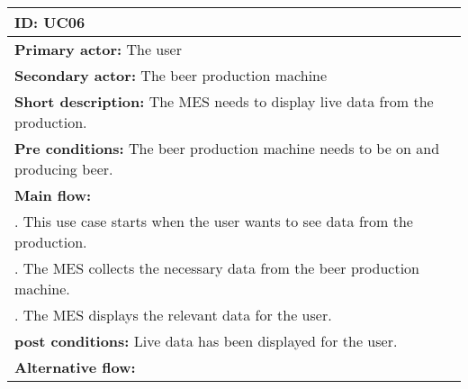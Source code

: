 \begin{table}[ht]
    \begin{tabularx}{\textwidth}{|>{\RaggedRight}X|}
        \hline
        \textbf{ID:} UC06  \\
        \hline
        \textbf{Primary actor:} The user \\
        \hline
        \textbf{Secondary actor:} The beer production machine \\
        \hline
        \textbf{Short description:} The MES needs to display live data from the
        production. \\
        \hline
        \textbf{Pre conditions:} The beer production machine needs to be on and
        producing beer. \\
        \hline
        \textbf{Main flow:} \\
        	1. This use case starts when the user wants to see data from the
        	production. \\
			2. The MES collects the necessary data from the beer production
			machine. \\
			3. The MES displays the relevant data for the user. \\
		\hline
        \textbf{post conditions:} Live data has been displayed for the user. \\
        \hline
        \textbf{Alternative flow:} \\
        \hline
    \end{tabularx}
    \label{table:usecase_displayLiveData}
\end{table}

